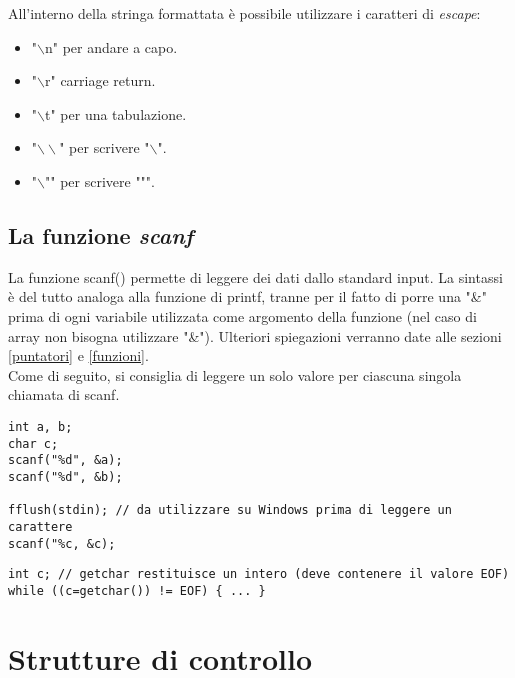 All'interno della stringa formattata è possibile utilizzare i caratteri di \textit{escape}:
\begin{itemize}[noitemsep]
	\item \colorbox{light-gray}{"$\backslash$n"} per andare a capo.
	\item \colorbox{light-gray}{"$\backslash$r"} carriage return.
	\item \colorbox{light-gray}{"$\backslash$t"} per una tabulazione.
	\item \colorbox{light-gray}{"$\backslash\backslash$"} per scrivere "$\backslash$".
	\item \colorbox{light-gray}{"$\backslash$""} per scrivere """.
\end{itemize}


\subsection{La funzione \textit{scanf}}
La funzione \colorbox{light-gray}{scanf()} permette di leggere dei dati dallo standard input. La sintassi è del tutto analoga alla funzione di printf, tranne per il fatto di porre una "\&" prima di ogni variabile utilizzata come argomento della funzione (nel caso di array non bisogna utilizzare "\&"). Ulteriori spiegazioni verranno date alle sezioni \ref{puntatori} e \ref{funzioni}.\\
Come di seguito, si consiglia di leggere un solo valore per ciascuna singola chiamata di scanf.
\begin{lstlisting}[title={Esempi di input con scanf}]
int a, b;
char c;
scanf("%d", &a);
scanf("%d", &b);

fflush(stdin); // da utilizzare su Windows prima di leggere un carattere
scanf("%c, &c);
\end{lstlisting}

\begin{lstlisting}[title={Leggere una sequenza di caratteri uno alla volta}]
int c; // getchar restituisce un intero (deve contenere il valore EOF)
while ((c=getchar()) != EOF) { ... }
\end{lstlisting}

\section{Strutture di controllo}

